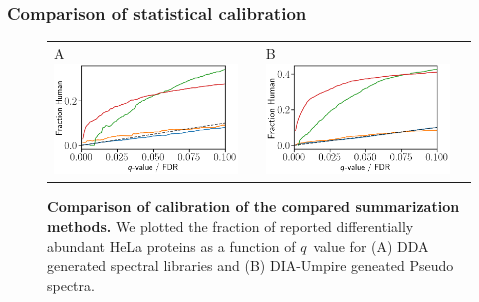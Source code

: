 \documentclass[11pt]{article}
\begin{document}
\subsubsection*{Comparison of statistical calibration}
\begin{figure}[hbt]
    \centering
    \centering
    \begin{tabular}{lclc} 
        A \includegraphics[width=0.5\linewidth]{../../result/report_plots/osw_FP_DE_all.png} & &%
        B \includegraphics[width=0.5\linewidth]{../../result/report_plots/diann_FP_DE_all.png} & \\%
    \end{tabular}
  \caption{{\bf Comparison of calibration of the compared summarization methods.} We plotted the fraction of reported differentially abundant HeLa proteins as a function of $q$~value for (A) DDA generated spectral libraries and (B) DIA-Umpire geneated Pseudo spectra. \label{fig:frac_hela_vs_fdr}}
\end{figure}
\fi
\end{document}
